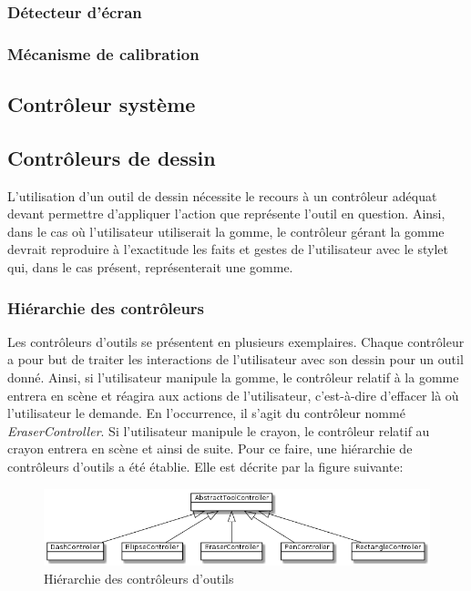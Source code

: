 \documentclass[11pt,a4paper,oldfontcommands]{memoir}
\begin{document}
\subsubsection{Détecteur d'écran}

\subsubsection{Mécanisme de calibration}

\subsection{Contrôleur système}

\newpage

\subsection{Contrôleurs de dessin}

L'utilisation d'un outil de dessin nécessite le recours à un contrôleur adéquat devant permettre d'appliquer l'action que représente l'outil en question. Ainsi, dans le cas où l'utilisateur utiliserait la gomme, le contrôleur gérant la gomme devrait reproduire à l'exactitude les faits et gestes de l'utilisateur avec le stylet qui, dans le cas présent, représenterait une gomme.

\subsubsection{Hiérarchie des contrôleurs}

Les contrôleurs d'outils se présentent en plusieurs exemplaires. Chaque contrôleur a pour but de traiter les interactions de l'utilisateur avec son dessin pour un outil donné. Ainsi, si l'utilisateur manipule la gomme, le contrôleur relatif à la gomme entrera en scène et réagira aux actions de l'utilisateur, c'est-à-dire d'effacer là où l'utilisateur le demande. En l'occurrence, il s'agit du contrôleur nommé \textit{EraserController}. Si l'utilisateur manipule le crayon, le contrôleur relatif au crayon entrera en scène et ainsi de suite. Pour ce faire, une hiérarchie de contrôleurs d'outils a été établie. Elle est décrite par la figure suivante:

\begin{figure}[h]
\centering
\includegraphics[scale=0.7]{images/tools-controllers-hierarchy.png}
\caption{Hiérarchie des contrôleurs d'outils}
\end{figure}
\end{document}
